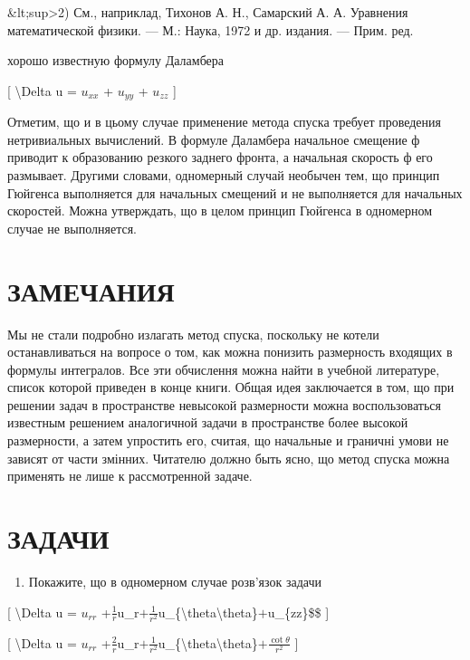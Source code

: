 \documentclass[
]{article}
\providecommand{\tightlist}{%
  \setlength{\itemsep}{0pt}\setlength{\parskip}{0pt}}
\begin{document}
{{\&lt;sup\textgreater2) См., наприклад, Тихонов А. Н., Самарский А. А.
Уравнения математической физики. --- М.: Наука, 1972 и др. издания. ---
Прим. ред.

хорошо известную формулу Даламбера

{[} \textbackslash Delta u = \(u_{xx}\) + \(u_{yy}\) + \(u_{zz}\) {]}

Отметим, що и в цьому случае применение метода спуска требует проведения
нетривиальных вычислений. В формуле Даламбера начальное смещение ф
приводит к образованию резкого заднего фронта, а начальная скорость ф
его размывает. Другими словами, одномерный случай необычен тем, що
принцип Гюйгенса выполняется для начальных смещений и не выполняется для
начальных скоростей. Можна утверждать, що в целом принцип Гюйгенса в
одномерном случае не выполняется.

\section{ЗАМЕЧАНИЯ}\label{ux437ux430ux43cux435ux447ux430ux43dux438ux44f-8}

Мы не стали подробно излагать метод спуска, поскольку не котели
останавливаться на вопросе о том, как можна понизить размерность
входящих в формулы интегралов. Все эти обчислення можна найти в учебной
литературе, список которой приведен в конце книги. Общая идея
заключается в том, що при решении задач в пространстве невысокой
размерности можна воспользоваться известным решением аналогичной задачи
в пространстве более высокой размерности, а затем упростить его, считая,
що начальные и граничні умови не зависят от части змінних. Читателю
должно быть ясно, що метод спуска можна применять не лише к
рассмотренной задаче.

\section{ЗАДАЧИ}\label{ux437ux430ux434ux430ux447ux438-8}

\begin{enumerate}
\def\labelenumi{\arabic{enumi}.}
\tightlist
\item
  Покажите, що в одномерном случае розв'язок задачи
\end{enumerate}

{[} \textbackslash Delta u = \(u_{rr}\)
+\(\frac{1}{r}\)u\_r\(+ \frac{1}{r^2}\)u\_\{\textbackslash theta\textbackslash theta\}\(+\)u\_\{zz\}\$\$
{]}

{[} \textbackslash Delta u = \(u_{rr}\)
+\(\frac{2}{r}\)u\_r\(+ \frac{1}{r^2}\)u\_\{\textbackslash theta\textbackslash theta\}\(+ \frac{\cot\theta}{r^2}\)
{]}

}}
\end{document}
